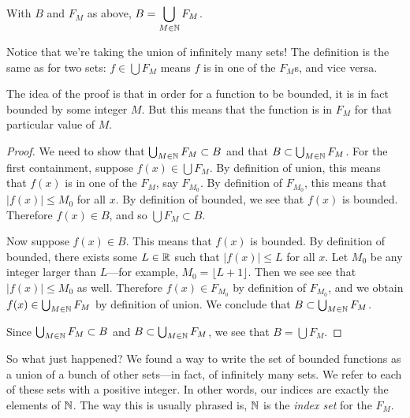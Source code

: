 \documentclass{tufte-book}
\begin{document}
\begin{claim}
  With $B$ and $F_M$ as above, $B = \displaystyle\bigcup_{M \in \mathbb{N}} F_M$. 
\end{claim}
Notice that we're taking the union of infinitely many sets! The definition is the same as for two sets: $f \in \bigcup F_M$ means $f$ is in one of the $F_M$s, and vice versa.

The idea of the proof is that in order for a function to be bounded, it is in fact bounded by some integer $M$. But this means that the function is in $F_M$ for that particular value of $M$. 

\begin{proof}
  We need to show that $\bigcup_{M \in \mathbb{N}} F_M \subset B$ and that $B \subset \bigcup_{M \in \mathbb{N}} F_M$. For the first containment, suppose $f(x) \in \bigcup F_M$. By definition of union, this means that $f(x)$ is in one of the $F_M$, say $F_{M_0}$.  By definition of $F_{M_0}$, this means that $|f(x)| \leq M_0$ for all $x$. By definition of bounded, we see that $f(x)$ is bounded. Therefore $f(x) \in B$, and so $\bigcup F_M \subset B$.

  Now suppose $f(x) \in B$. This means that $f(x)$ is bounded. By definition of bounded,  there exists some $L \in \mathbb{R}$ such that $|f(x)| \leq L$ for all $x$. Let $M_0$ be any integer larger than $L$---for example, $M_0 = \lfloor L + 1\rfloor$. Then we see see that $|f(x)| \leq M_0$ as well. Therefore $f(x) \in F_{M_0}$ by definition of $F_{M_0}$, and we obtain $f(x) \in \bigcup_{M \in \mathbb{N}} F_M$ by definition of union. We conclude that $B \subset \bigcup_{M \in \mathbb{N}} F_M$.

  Since $\bigcup_{M \in \mathbb{N}} F_M \subset B$ and $B \subset \bigcup_{M \in \mathbb{N}} F_M$, we see that $B = \bigcup F_M$.
\end{proof}

So what just happened? We found a way to write the set of bounded functions as a union of a bunch of other sets---in fact, of infinitely many sets. We refer to each of these sets with a positive integer. In other words, our indices are exactly the elements of $\mathbb{N}$. The way this is usually phrased is, $\mathbb{N}$ is the \emph{index set} for the $F_M$. 
\end{document}
